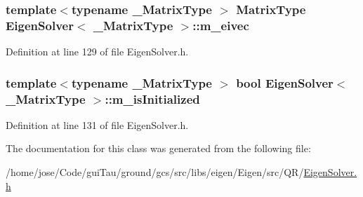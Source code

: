 \hypertarget{class_eigen_solver_a3e70e63cdecd25adfdfa895c867269b7}{
\subsubsection[{m\-\_\-eivec}]{\setlength{\rightskip}{0pt plus 5cm}template$<$typename \-\_\-\-Matrix\-Type $>$ {\bf Matrix\-Type} {\bf Eigen\-Solver}$<$ \-\_\-\-Matrix\-Type $>$\-::m\-\_\-eivec\hspace{0.3cm}{\ttfamily [protected]}}}\label{class_eigen_solver_a3e70e63cdecd25adfdfa895c867269b7}


Definition at line 129 of file Eigen\-Solver.\-h.

\hypertarget{class_eigen_solver_ab982df42f44631be52969b190229c47a}{
\subsubsection[{m\-\_\-is\-Initialized}]{\setlength{\rightskip}{0pt plus 5cm}template$<$typename \-\_\-\-Matrix\-Type $>$ bool {\bf Eigen\-Solver}$<$ \-\_\-\-Matrix\-Type $>$\-::m\-\_\-is\-Initialized\hspace{0.3cm}{\ttfamily [protected]}}}\label{class_eigen_solver_ab982df42f44631be52969b190229c47a}


Definition at line 131 of file Eigen\-Solver.\-h.



The documentation for this class was generated from the following file\-:\begin{DoxyCompactItemize}
\item 
/home/jose/\-Code/gui\-Tau/ground/gcs/src/libs/eigen/\-Eigen/src/\-Q\-R/\hyperlink{_eigen_solver_8h}{Eigen\-Solver.\-h}\end{DoxyCompactItemize}
